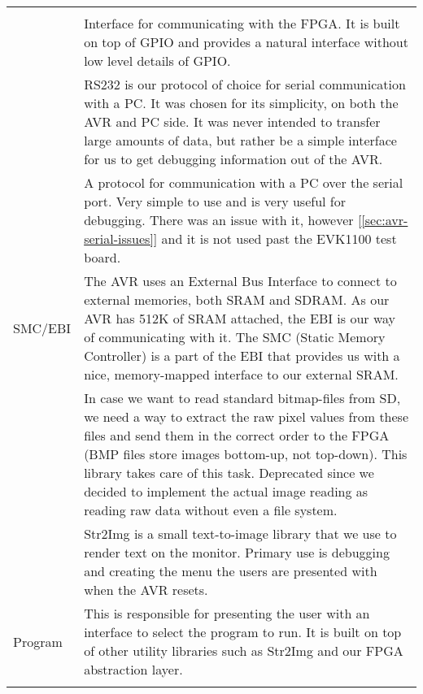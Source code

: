 \begin{table}[htbp]
\begin{tabular}{l|p{10cm}}
\begin{comment}
	On top of GPIO, we wrote our code to abstract some of the details of
	GPIO, and provide a more natural interface for us to use. \\
\end{comment}
	FPGA/GPIO & Interface for communicating with the FPGA. It is built on top of GPIO
	and provides a natural interface without low level details of GPIO. \\
	\hline
\begin{comment}
	RS232 & RS232 is our protocol of choice for serial communication with a PC. It
	was chosen for its simplicity, on both the AVR and PC side. It was never
	intended to transfer large amounts of data, but rather be a simple
	interface for us to get debugging information out of the AVR. \\
\end{comment}
	RS232 & A protocol for communication with a PC over the serial port. Very simple to
	use and is very useful for debugging. There was an issue with it, however [\ref{sec:avr-serial-issues}]
	and it is not used past the EVK1100 test board. \\
	\hline
	SMC/EBI & The AVR uses an External Bus Interface to connect to external memories,
	both SRAM and SDRAM. As our AVR has 512K of SRAM attached, the EBI is
	our way of communicating with it.
	The SMC (Static Memory Controller) is a part of the EBI that provides us
	with a nice, memory-mapped interface to our external SRAM. \\
	\hline
\begin{comment}
	BMP & In case we want to read standard bitmap-files from SD, we need a way to
	extract the raw pixel values from these files and send them in the
	correct order to the FPGA (BMP files store images bottom-up, not
	top-down). This library takes care of this task. Deprecated since we
	decided to implement the actual image reading as reading raw data without
	even a file system. \\
	\hline
\end{comment}
	Str2Img & Str2Img is a small text-to-image library that we use to render text on
	the monitor. Primary use is debugging and creating the menu the users are presented
	with when the AVR resets. \\
	\hline
	Program & This is responsible for presenting the user with an
	interface to select the program to run. It is built on top of other
	utility libraries such as Str2Img and our FPGA abstraction layer. \\
	\hline
\begin{comment}

\end{comment}
\end{tabular}
\end{table}
